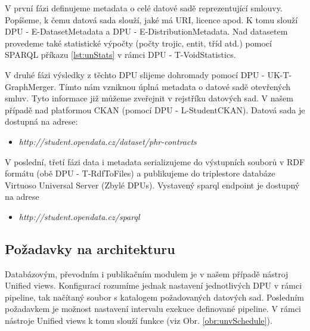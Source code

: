 V první fázi definujeme metadata o celé datové sadě reprezentující smlouvy. Popíšeme, k čemu datová sada slouží, jaké má URI, licence apod. K tomu slouží DPU - E-DatasetMetadata a DPU - E-DistributionMetadata. Nad datasetem provedeme také statistické výpočty (počty trojic, entit, tříd atd.) pomocí SPARQL příkazu \ref{lst:unStats} v rámci DPU - T-VoidStatistics. 



V druhé fázi výsledky z těchto DPU slijeme dohromady pomocí DPU - UK-T-GraphMerger. Tímto nám vzniknou úplná metadata o datové sadě otevřených smluv. Tyto informace již můžeme zveřejnit v rejstříku datových sad. V našem případě nad platformou CKAN\cite{ckan} (pomocí DPU - L-StudentCKAN). Datová sada je dostupná na adrese:

\begin{itemize}
\item \textit{http://student.opendata.cz/dataset/phr-contracts }\cite{contractCkan}
\end{itemize}

V poslední, třetí fázi data i metadata serializujeme do výstupních souborů v RDF formátu (obě DPU - T-RdfToFiles) a publikujeme do triplestore databáze Virtuoso Universal Server\cite{virtuoso} (Zbylé DPUs). Vystavený sparql endpoint je dostupný na adrese

\begin{itemize}
\item \textit{http://student.opendata.cz/sparql}
\end{itemize}

\subsection{Požadavky na architekturu}

Databázovým, převodním i publikačním modulem je v našem případě nástroj Unified views. Konfigurací rozumíme jednak nastavení jednotlivých DPU v rámci pipeline, tak načítaný soubor s katalogem požadovaných datových sad. Posledním požadavkem je možnost nastavení intervalu exekuce definované pipeline. V rámci nástroje Unified views k tomu slouží funkce  (viz Obr. \ref{obr:unvSchedule}).

